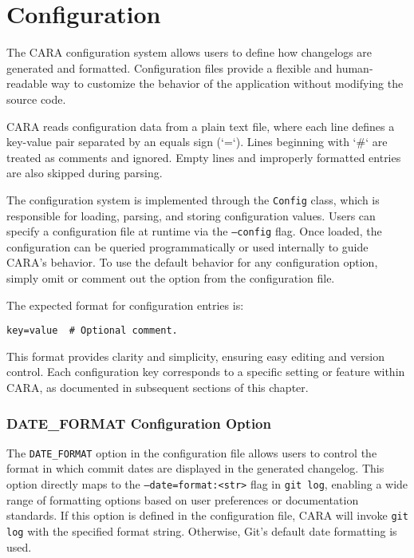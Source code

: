 \chapter{Configuration}
\label{ch:configuration}
\pagestyle{fancy}

The CARA configuration system allows users to define how changelogs are generated and formatted. Configuration files provide a flexible and human-readable way to customize the behavior of the application without modifying the source code.

CARA reads configuration data from a plain text file, where each line defines a key-value pair separated by an equals sign (`=`). Lines beginning with `\#` are treated as comments and ignored. Empty lines and improperly formatted entries are also skipped during parsing.

The configuration system is implemented through the \texttt{Config} class, which is responsible for loading, parsing, and storing configuration values. Users can specify a configuration file at runtime via the \texttt{--config} flag. Once loaded, the configuration can be queried programmatically or used internally to guide CARA’s behavior. To use the default behavior for any configuration option, simply omit or comment out the option from the configuration file.

The expected format for configuration entries is:

\begin{lstlisting}[style=cppstyle]
key=value  # Optional comment.
\end{lstlisting}

This format provides clarity and simplicity, ensuring easy editing and version control. Each configuration key corresponds to a specific setting or feature within CARA, as documented in subsequent sections of this chapter.















\subsection{DATE\_FORMAT Configuration Option}

The \texttt{DATE\_FORMAT} option in the configuration file allows users to control the format in which commit dates are displayed in the generated changelog. This option directly maps to the \texttt{--date=format:<str>} flag in \texttt{git log}, enabling a wide range of formatting options based on user preferences or documentation standards. If this option is defined in the configuration file, CARA will invoke \texttt{git log} with the specified format string. Otherwise, Git's default date formatting is used.

